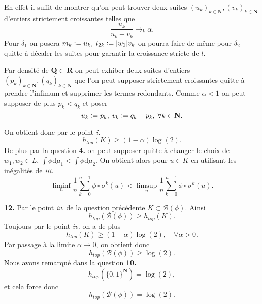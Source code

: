 \documentclass[12pt]{article}
\newcommand{\defeq}{\vcentcolon=}
\newcommand{\R}{\mathbf{R}}
\newcommand{\N}{\mathbf{N}}
\newcommand{\Q}{\mathbf{Q}}
\newcommand{\de}{\mathrm{d}}
\begin{document}
En effet il suffit de montrer qu'on peut trouver deux suites $(u_{k})_{k\in\N}, (v_{k})_{k\in\N}$ d'entiers strictement croissantes telles que \[
        \frac{u_{k}}{u_{k}+v_{k}} \to_{k} \alpha
.\] Pour $\delta_{1}$ on posera $m_{k} \defeq u_{k}, \; l_{2k} \defeq |w_{1}|v_{k}$ on pourra faire de même pour $\delta_{2}$ quitte à décaler les suites pour garantir la croissance stricte de $l$. 

Par densité de $\Q \subset \R$ on peut exhiber deux suites d'entiers $(p_{k})_{k\in\N}, (q_{k})_{k\in\N}$ que l'on peut supposer strictement croissantes quitte à prendre l'infimum et supprimer les termes redondants. Comme $\alpha < 1$ on peut supposer de plus $p_{k} < q_{k}$ et poser  \[
u_{k} \defeq p_{k}, \; v_{k} \defeq q_{k} - p_{k}, \; \forall k \in \N
.\] 

On obtient donc par le point \textit{i.} \[
h_{top}(K) \ge (1-\alpha)\log(2)
.\] De plus par la question \textbf{4.} on peut supposer quitte à changer le choix de $w_{1}, w_{2} \in L$, $\int\phi\de\mu_{1} < \int\phi\de\mu_{2}$. On obtient alors pour $u \in K$ en utilisant les inégalités de \textit{iii.}
\[
        \liminf_{n}\frac{1}{n}\sum_{k=0}^{n-1} \phi\circ\sigma^{k}(u) < \limsup_{n}\frac{1}{n}\sum_{k=0}^{n-1} \phi\circ\sigma^{k}(u)
.\] 

\medskip

\textbf{12.} Par le point \textit{iv.} de la question précédente $K \subset \mathcal{B}(\phi)$. Ainsi \[
        h_{top}(\mathcal{B}(\phi)) \ge h_{top}(K)
.\] Toujours par le point \textit{iv.} on a de plus  \[
h_{top}(K) \ge (1-\alpha)\log(2), \quad \forall \alpha > 0
.\]
Par passage à la limite $\alpha \to 0$, on obtient donc \[
        h_{top}(\mathcal{B}(\phi)) \ge \log(2)
.\] 
Nous avons remarqué dans la question \textbf{10.} \[
        h_{top}(\{0,1\}^{\N}) = \log(2)
,\] et cela force donc \[
h_{top}(\mathcal{B}(\phi)) = \log(2)
.\]  
\end{document}
